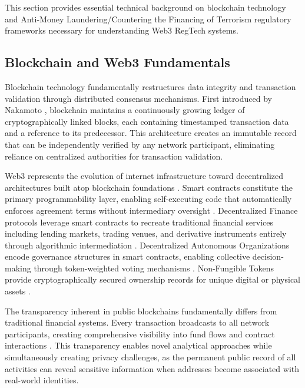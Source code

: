\documentclass[conference,compsoc]{IEEEtran}
\begin{document}
This section provides essential technical background on blockchain technology and Anti-Money Laundering/Countering the Financing of Terrorism regulatory frameworks necessary for understanding Web3 RegTech systems.

\subsection{Blockchain and Web3 Fundamentals}

Blockchain technology fundamentally restructures data integrity and transaction validation through distributed consensus mechanisms. First introduced by Nakamoto \cite{nakamoto2008bitcoinpeertopeerelectronic}, blockchain maintains a continuously growing ledger of cryptographically linked blocks, each containing timestamped transaction data and a reference to its predecessor. This architecture creates an immutable record that can be independently verified by any network participant, eliminating reliance on centralized authorities for transaction validation.

Web3 represents the evolution of internet infrastructure toward decentralized architectures built atop blockchain foundations \cite{wood2014ethereumsecuredecentralised}. Smart contracts constitute the primary programmability layer, enabling self-executing code that automatically enforces agreement terms without intermediary oversight \cite{szabo1997formalizingsecuringrelationships}. Decentralized Finance protocols leverage smart contracts to recreate traditional financial services including lending markets, trading venues, and derivative instruments entirely through algorithmic intermediation \cite{harvey2021defifuturefinance}. Decentralized Autonomous Organizations encode governance structures in smart contracts, enabling collective decision-making through token-weighted voting mechanisms \cite{voshmgir2020tokeneconomyhow}. Non-Fungible Tokens provide cryptographically secured ownership records for unique digital or physical assets \cite{wang2021nonfungibletokennft}.

The transparency inherent in public blockchains fundamentally differs from traditional financial systems. Every transaction broadcasts to all network participants, creating comprehensive visibility into fund flows and contract interactions \cite{narayanan2016bitcoincryptocurrencytechnologies}. This transparency enables novel analytical approaches while simultaneously creating privacy challenges, as the permanent public record of all activities can reveal sensitive information when addresses become associated with real-world identities.
\end{document}
